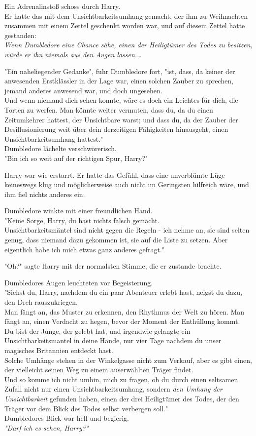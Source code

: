 {Ein Adrenalinstoß schoss durch Harry.\\ Er hatte das mit dem Unsichtbarkeitsumhang gemacht, der ihm zu Weihnachten zusammen mit einem Zettel geschenkt worden war, und auf diesem Zettel hatte gestanden:\\ \emph{Wenn Dumbledore eine Chance sähe, einen der Heiligtümer des Todes zu besitzen, würde er ihn} \emph{niemals aus den Augen lassen.}…

"Ein naheliegender Gedanke", fuhr Dumbledore fort, "ist, dass, da keiner der anwesenden Erstklässler in der Lage war, einen solchen Zauber zu sprechen, jemand anderes anwesend war, und doch ungesehen.\\ Und wenn niemand dich sehen konnte, wäre es doch ein Leichtes für dich, die Torten zu werfen. Man könnte weiter vermuten, dass du, da du einen Zeitumkehrer hattest, der Unsichtbare warst; und dass du, da der Zauber der Desillusionierung weit über dein derzeitigen Fähigkeiten hinausgeht, einen Unsichtbarkeitsumhang hattest."\\ Dumbledore lächelte verschwörerisch.\\ "Bin ich so weit auf der richtigen Spur, Harry?"

Harry war wie erstarrt. Er hatte das Gefühl, dass eine unverblümte Lüge keineswegs klug und möglicherweise auch nicht im Geringsten hilfreich wäre, und ihm fiel nichts anderes ein.

Dumbledore winkte mit einer freundlichen Hand.\\ "Keine Sorge, Harry, du hast nichts falsch gemacht.\\ Unsichtbarkeitsmäntel sind nicht gegen die Regeln - ich nehme an, sie sind selten genug, dass niemand dazu gekommen ist, sie auf die Liste zu setzen. Aber eigentlich habe ich mich etwas ganz anderes gefragt."

"Oh?" sagte Harry mit der normalsten Stimme, die er zustande brachte.

Dumbledores Augen leuchteten vor Begeisterung.\\ "Siehst du, Harry, nachdem du ein paar Abenteuer erlebt hast, neigst du dazu, den Dreh rauszukriegen.\\ Man fängt an, das Muster zu erkennen, den Rhythmus der Welt zu hören. Man fängt an, einen Verdacht zu hegen, bevor der Moment der Enthüllung kommt.\\ Du bist der Junge, der gelebt hat, und irgendwie gelangte ein Unsichtbarkeitsmantel in deine Hände, nur vier Tage nachdem du unser magisches Britannien entdeckt hast.\\ Solche Umhänge stehen in der Winkelgasse nicht zum Verkauf, aber es gibt einen, der vielleicht seinen Weg zu einem auserwählten Träger findet.\\ Und so komme ich nicht umhin, mich zu fragen, ob du durch einen seltsamen Zufall nicht nur einen Unsichtbarkeitsumhang, sondern \emph{den Umhang der Unsichtbarkeit} gefunden haben, einen der drei Heiligtümer des Todes, der den Träger vor dem Blick des Todes selbst verbergen soll."\\ Dumbledores Blick war hell und begierig.\\ \emph{"Darf ich es sehen, Harry?"}

}
